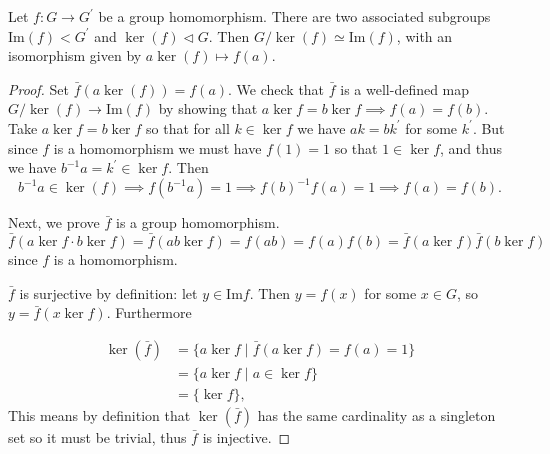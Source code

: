 \begin{theorem}
Let $f : G \to G^\prime$ be a group homomorphism. There are two
associated subgroups $\mathrm{Im}(f) < G^\prime$ and
$\ker(f) \triangleleft G$. Then
$G / \ker(f) \simeq \mathrm{Im}(f)$, with an isomorphism given by
$a \ker(f) \mapsto f(a)$.
\end{theorem}
\begin{proof}
Set $\bar{f}(a \ker (f)) = f(a)$. We check that $\bar{f}$ is a
well-defined map $G / \ker(f) \to \mathrm{Im}(f)$ by showing that
$a \ker f = b \ker f \implies f(a) = f(b)$. Take
$a \ker f = b \ker f$ so that for all $k \in \ker f$ we have
$a k = b k^\prime$ for some $k^\prime$. But since $f$ is a homomorphism
we must have $f(1) = 1$ so that $1 \in \ker f$, and thus we have
$b^{-1} a = k^\prime \in \ker f$. Then
$$
b^{-1} a \in \ker(f)
  \implies f(b^{-1} a) = 1
  \implies f(b)^{-1} f(a) = 1
  \implies f(a) = f(b).
$$

Next, we prove $\bar{f}$ is a group homomorphism.
$$
\bar{f}(a \ker f \cdot b \ker f)
  = \bar{f} (a b \ker f)
  = f(ab)
  = f(a)f(b)
  = \bar{f}(a \ker f) \bar{f}(b \ker f)
$$
since $f$ is a homomorphism.

$\bar{f}$ is surjective by definition: let $y \in \mathrm{Im} f$. Then $y = f(x)$
for some $x \in G$, so $y = \bar{f}(x \ker f)$. Furthermore

\begin{align*}
\ker(\bar{f}) & = \{ a \ker f \mid \bar{f}(a \ker f) = f(a) = 1 \} \\
              & = \{ a \ker f \mid a \in \ker f \} \\
              & = \{ \ker f \},
\end{align*}
This means by definition that $\ker(\bar{f})$ has the same cardinality
as a singleton set so it must be trivial, thus $\bar{f}$ is injective.
\end{proof}

